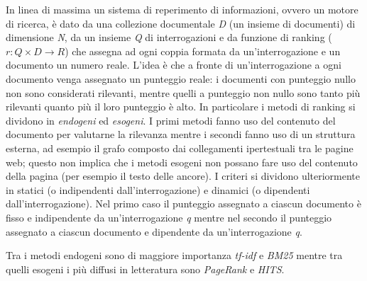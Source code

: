 In linea di massima un sistema di reperimento di informazioni, ovvero un motore di ricerca, è dato da una collezione documentale \textit{D} (un insieme di documenti) di dimensione \textit{N}, da un insieme \textit{Q} di interrogazioni e da funzione di ranking (\(r : Q \times D \rightarrow R\)) che
assegna ad ogni coppia formata da un’interrogazione e un documento un numero reale. L’idea è che a fronte di un’interrogazione a ogni documento venga assegnato un punteggio reale: i documenti con punteggio nullo non sono considerati rilevanti, mentre quelli a punteggio non nullo sono tanto più rilevanti quanto più il loro punteggio è alto. In particolare i metodi di ranking si dividono in \textit{endogeni} ed \textit{esogeni}. I primi metodi fanno uso del contenuto del documento per valutarne la rilevanza mentre i secondi fanno uso di un struttura esterna, ad esempio il grafo composto dai collegamenti ipertestuali tra le pagine web; questo non implica che i metodi esogeni non possano fare uso del contenuto della pagina (per esempio il testo delle ancore). I criteri si dividono ulteriormente in statici (o indipendenti dall’interrogazione) e dinamici (o dipendenti dall’interrogazione). Nel primo caso il punteggio assegnato a ciascun documento è fisso e indipendente da un'interrogazione \textit{q} mentre nel 
secondo il punteggio assegnato a ciascun documento e dipendente da un'interrogazione \textit{q}.

Tra i metodi endogeni sono di maggiore importanza \textit{tf-idf} e \textit{BM25} mentre tra quelli esogeni i più diffusi in letteratura sono \textit{PageRank} e \textit{HITS}.

